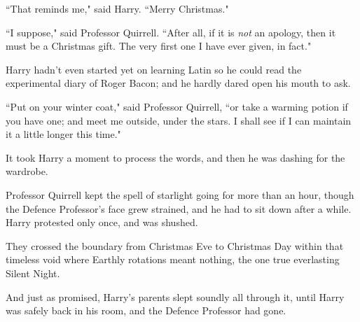 ``That reminds me," said Harry. ``Merry Christmas."

``I suppose," said Professor Quirrell. ``After all, if it is \emph{not} an apology, then it must be a Christmas gift. The very first one I have ever given, in fact."

Harry hadn't even started yet on learning Latin so he could read the experimental diary of Roger Bacon; and he hardly dared open his mouth to ask.

``Put on your winter coat," said Professor Quirrell, ``or take a warming potion if you have one; and meet me outside, under the stars. I shall see if I can maintain it a little longer this time."

It took Harry a moment to process the words, and then he was dashing for the wardrobe.

Professor Quirrell kept the spell of starlight going for more than an hour, though the Defence Professor's face grew strained, and he had to sit down after a while. Harry protested only once, and was shushed.

They crossed the boundary from Christmas Eve to Christmas Day within that timeless void where Earthly rotations meant nothing, the one true everlasting Silent Night.

And just as promised, Harry's parents slept soundly all through it, until Harry was safely back in his room, and the Defence Professor had gone.
